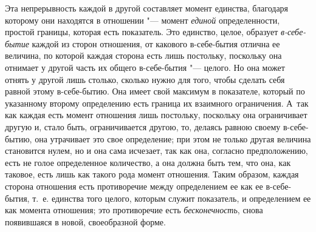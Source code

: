 Эта непрерывность каждой в другой составляет момент единства, благодаря
которому они находятся в отношении "--- момент
{\em единой} определенности, простой границы, которая
есть показатель. Это единство, целое, образует
{\em в-себе-бытие} каждой из сторон отношения, от
какового в-себе-бытия отлична ее {}
величина, по которой каждая сторона есть лишь постольку, поскольку она
отнимает у другой часть их общего в-себе-бытия "--- целого. Но она может
отнять у другой лишь столько, сколько нужно для того, чтобы сделать себя
равной этому в-себе-бытию. Она имеет свой максимум в показателе, который по
указанному второму определению есть граница их взаимного ограничения. А~так
как каждая есть момент отношения лишь постольку, поскольку она ограничивает
другую и, стало быть, ограничивается другою, то, делаясь равною своему
в-себе-бытию, она утрачивает это свое определение; при этом не только
другая величина становится нулем,
но и она сама исчезает, так как она, согласно предположению, есть не голое
определенное количество, а она должна быть тем, что она, как таковое, есть
лишь как такого рода момент отношения. Таким образом, каждая сторона
отношения есть противоречие между определением ее как ее
в-себе-бытия, т.~е. единства того целого, которым служит показатель, и
определением ее как момента отношения; это противоречие есть
{\em бесконечность}, снова появившаяся в новой, своеобразной форме.

